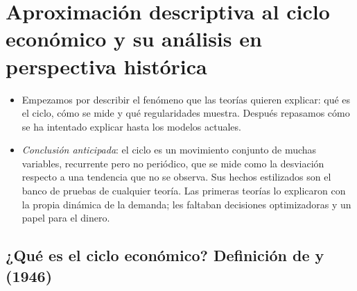 \documentclass[11pt]{article}
\begin{document}
\section{Aproximación descriptiva al ciclo económico\cortetitulo{} y su análisis en perspectiva histórica}\label{sec:ciclo}

\begin{itemize}
\item Empezamos por describir el fenómeno que las teorías quieren explicar: qué es el ciclo, cómo se mide y qué regularidades muestra. Después repasamos cómo se ha intentado explicar hasta los modelos actuales.
\item \emph{Conclusión anticipada}: el ciclo es un movimiento conjunto de muchas variables, recurrente pero no periódico, que se mide como la desviación respecto a una tendencia que no se observa. Sus hechos estilizados son el banco de pruebas de cualquier teoría. Las primeras teorías lo explicaron con la propia dinámica de la demanda; les faltaban decisiones optimizadoras y un papel para el dinero.
\end{itemize}

\subsection{¿Qué es el ciclo económico? Definición de  y  (1946)}\label{sec:definicion}
\end{document}
